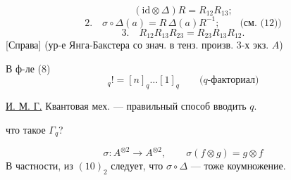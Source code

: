 \[
(\mathrm{id}\otimes\Delta)R=R_{12}R_{13};
\]
\[
2.\quad \sigma\circ\Delta(a)=R\,\Delta(a)R^{-1};\qquad
 \text{(см. (12))}
\]
\[
3.\quad R_{12}R_{13}R_{23}=R_{23}R_{13}R_{12}.
\]
[Справа] (ур-е Янга-Бакстера со знач. в тенз. произв. 3-х экз. \(A\))

В ф-ле (8)
\begin{equation*}
[n]_q!=[n]_q\ldots[1]_q\qquad\text{(\(q\)-факториал)}
\tag{11}
\end{equation*}

\underline{И. М. Г.} Квантовая мех. --- правильный способ вводить \(q\).

 что такое \(\Gamma_q\)?

\begin{equation*}
\sigma\colon A^{\otimes2}\longrightarrow A^{\otimes2},\qquad
\sigma(f\otimes g)=g\otimes f
\tag{12}
\end{equation*}
В частности, из \((10)_2\) следует, что \(\sigma\circ\Delta\) --- тоже коумножение.


